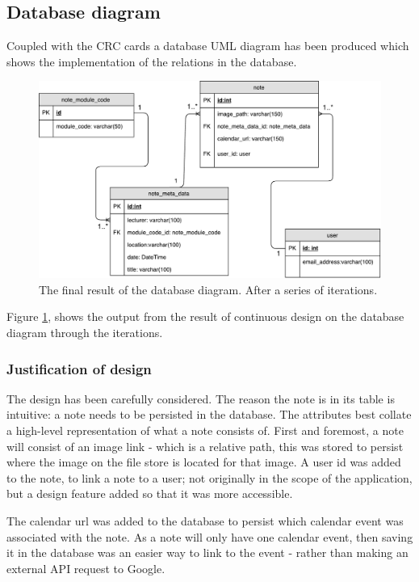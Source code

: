 \subsection{Database diagram}
Coupled with the CRC cards a database UML diagram has been produced which shows the implementation of the relations in the database.

\begin{figure}[h]
  \centering
  \includegraphics[scale=0.5]{images/database_diagram}
  \caption{The final result of the database diagram. After a series of iterations.}
  \label{fig:database}
\end{figure}

Figure \ref{fig:database}, shows the output from the result of continuous design on the database diagram through the iterations.

\subsubsection{Justification of design}
The design has been carefully considered. The reason the note is in its table is intuitive: a note needs to be persisted in the database. The attributes best collate a high-level representation of what a note consists of. First and foremost,  a note will consist of an image link - which is a relative path, this was stored to persist where the image on the file store is located for that image. A user id was added to the note, to link a note to a user; not originally in the scope of the application, but a design feature added so that it was more accessible.

The calendar url was added to the database to persist which calendar event was associated with the note. As a note will only have one calendar event, then saving it in the database was an easier way to link to the event - rather than making an external API request to Google.

